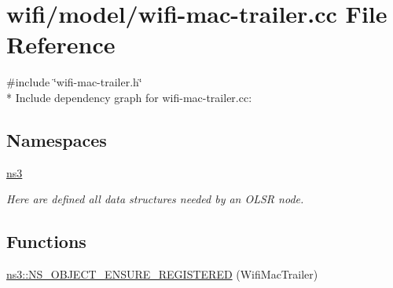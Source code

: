 \hypertarget{wifi-mac-trailer_8cc}{}\section{wifi/model/wifi-\/mac-\/trailer.cc File Reference}
\label{wifi-mac-trailer_8cc}
{\ttfamily \#include \char`\"{}wifi-\/mac-\/trailer.\+h\char`\"{}}\\*
Include dependency graph for wifi-\/mac-\/trailer.cc\+:
\subsection*{Namespaces}
\begin{DoxyCompactItemize}
\item 
 \hyperlink{namespacens3}{ns3}
\begin{DoxyCompactList}\small\item\em Here are defined all data structures needed by an O\+L\+SR node. \end{DoxyCompactList}\end{DoxyCompactItemize}
\subsection*{Functions}
\begin{DoxyCompactItemize}
\item 
\hyperlink{namespacens3_a1f532cea4ca883dab4e9624a8f56823f}{ns3\+::\+N\+S\+\_\+\+O\+B\+J\+E\+C\+T\+\_\+\+E\+N\+S\+U\+R\+E\+\_\+\+R\+E\+G\+I\+S\+T\+E\+R\+ED} (Wifi\+Mac\+Trailer)
\end{DoxyCompactItemize}
